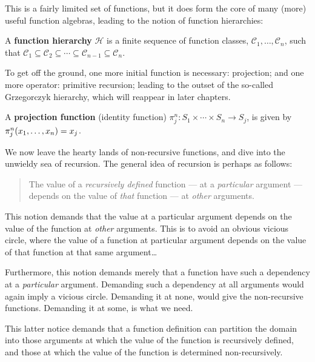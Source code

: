 This is a fairly limited set of functions, but it does form the core of many
(more) useful function algebras, leading to the notion of function hierarchies:

\begin{definition} A \textbf{function hierarchy} $\mathcal{H}$ is a finite
sequence of function classes, $\mathcal{C}_1, \ldots, \mathcal{C}_n$, such that
$\mathcal{C}_1 \subseteq \mathcal{C}_2 \subseteq \cdots \subseteq
\mathcal{C}_{n-1} \subseteq \mathcal{C}_n$. \end{definition}

To get off the ground, one more initial function is necessary: projection; and
one more operator: primitive recursion; leading to the outset of the so-called
Grzegorczyk hierarchy, which will reappear in later chapters.

\begin{definition} A \textbf{projection function} (identity function) $\pi_j^n
: S_1 \times \cdots \times S_n \rightarrow S_j$, is given by
$\pi_j^n{\mathopen{}\left({x_1,\ldots,x_n}\right)\mathclose{}} = x_j$. \end{definition}

We now leave the hearty lands of non-recursive functions, and dive into the
unwieldy sea of recursion. The general idea of recursion is perhaps as follows:

\begin{quote}

The value of a \emph{recursively defined} function --- at a \emph{particular}
argument --- depends on the value of \emph{that} function --- at \emph{other}
arguments.

\end{quote}

This notion demands that the value at a particular argument depends on the
value of the function at \emph{other} arguments. This is to avoid an obvious
vicious circle, where the value of a function at particular argument depends on
the value of that function at that same argument\ldots

Furthermore, this notion demands merely that a function have such a dependency
at a \emph{particular} argument. Demanding such a dependency at all arguments
would again imply a vicious circle. Demanding it at none, would give the
non-recursive functions. Demanding it at some, is what we need.

This latter notice demands that a function definition can partition the domain
into those arguments at which the value of the function is recursively defined,
and those at which the value of the function is determined non-recursively.

